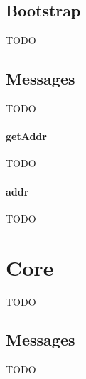 \subsection{Bootstrap}
TODO

\subsection{Messages}
TODO

\paragraph{getAddr}
TODO

\paragraph{addr}
TODO

\section{Core}
TODO

\subsection{Messages}
TODO
